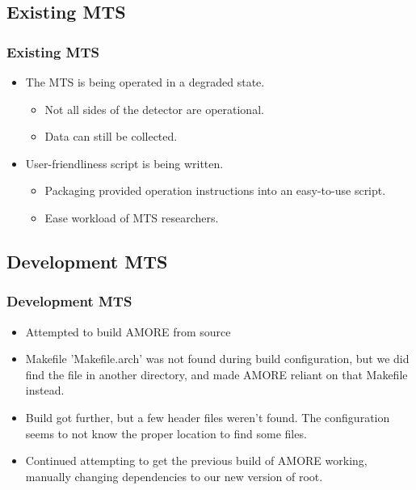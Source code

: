 \documentclass[aspectratio=169]{beamer}
\begin{document}

\subsection{Existing MTS}

\begin{frame}

  \frametitle{Existing MTS}

  \begin{itemize}
  \item The MTS is being operated in a degraded state.
    \begin{itemize}
    \item Not all sides of the detector are operational.
    \item Data can still be collected.
    \end{itemize}
  \item User-friendliness script is being written.
    \begin{itemize}
    \item Packaging provided operation instructions into an easy-to-use
      script.
    \item Ease workload of MTS researchers.
    \end{itemize}
  \end{itemize}

\end{frame}



\subsection{Development MTS}

\begin{frame}

  \frametitle{Development MTS}

  \begin{itemize}
    \item Attempted to build AMORE from source
    \item Makefile 'Makefile.arch' was not found during build configuration, but
      we did find the file in another directory, and made AMORE reliant on that
      Makefile instead.
    \item Build got further, but a few header files weren't found. The
      configuration seems to not know the proper location to find some files.
    \item Continued attempting to get the previous build of AMORE working,
    	  manually changing dependencies to our new version of root.
  \end{itemize}

\end{frame}
\end{document}
